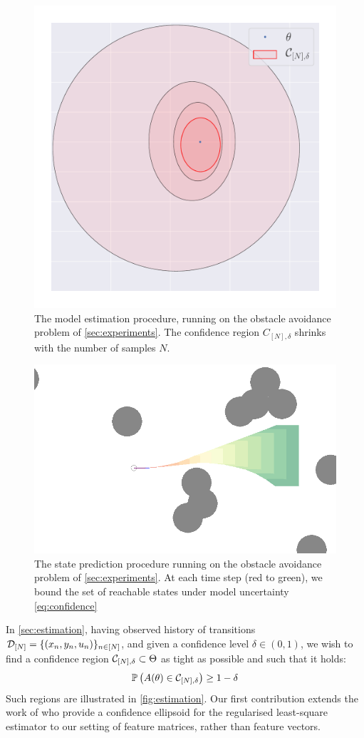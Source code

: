 \begin{figure}[t]
	\centering
	\includegraphics[trim={0 2cm 0 0}, clip, width=0.6\linewidth]{img/ellipsoid}
	\caption{The model estimation procedure, running on the obstacle avoidance problem of \autoref{sec:experiments}. The confidence region $C_{[N],\delta}$ shrinks with the number of samples $N$.}
	\label{fig:estimation}
\end{figure}

\begin{figure}[t]
	\centering
	\includegraphics[width=0.8\linewidth]{img/obstacle_small}
	\caption{The state prediction procedure running on the obstacle avoidance problem of \autoref{sec:experiments}. At each time step (red to green), we bound the set of reachable states under model uncertainty \eqref{eq:confidence}}
	\label{fig:prediction}
\end{figure}

In \autoref{sec:estimation}, having observed history of transitions $\mathcal{D}_{[N]} = \{(x_n, y_n,u_n)\}_{n\in[N]}$, and given a confidence level $\delta\in(0, 1)$, we wish to find a confidence region $\mathcal{C}_{[N],\delta} \subset \Theta$ as tight as possible and such that it holds:
\begin{align}
\mathbb{P}\left(A(\theta)\in \mathcal{C}_{[N],\delta}\right) \geq 1-\delta
\label{eq:confidence}
\end{align}
Such regions are illustrated in \autoref{fig:estimation}. Our first contribution extends the work of \citet{Abbasi2011} who provide a confidence ellipsoid for the regularised least-square estimator to our setting of feature matrices, rather than feature vectors.


